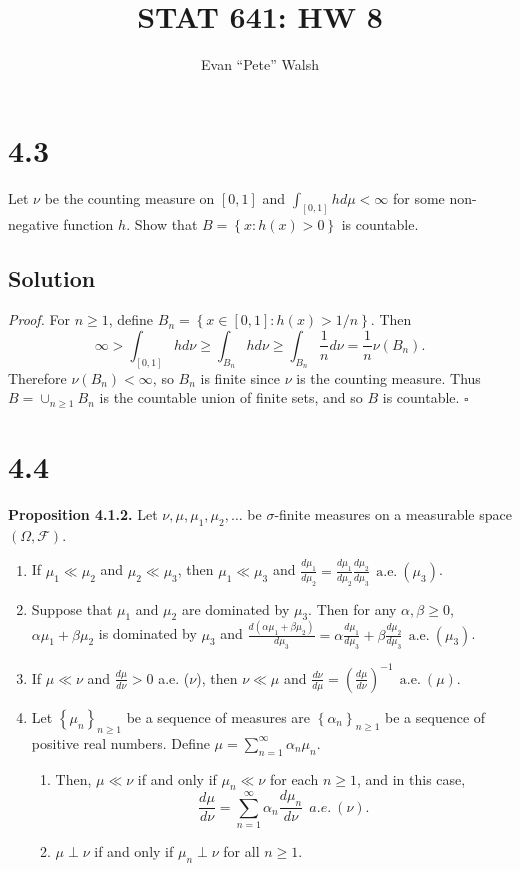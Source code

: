 \documentclass[12pt]{article}
\title{STAT 641: HW 8}
\author{Evan ``Pete'' Walsh}
\newcounter{ProofCounter}
\newenvironment{Proof}{\stepcounter{ProofCounter}\textit{Proof.}}{\hfill$\square$}
\begin{document}
\maketitle

\section*{4.3}
Let $\nu$ be the counting measure on $[0,1]$ and $\int_{[0,1]}hd\mu < \infty$ for some non-negative function $h$. Show that $B = \left\{ x : h(x) > 0
\right\}$ is countable.

\subsection*{Solution}
\begin{Proof}
For $n \geq 1$, define $B_{n} = \left\{ x \in [0,1] : h(x) > 1/n \right\}$. Then 
\[ \infty > \int_{[0,1]}hd\nu \geq \int_{B_{n}}hd\nu \geq \int_{B_{n}}\frac{1}{n}d\nu = \frac{1}{n}\nu(B_{n}). \]
Therefore $\nu(B_{n}) < \infty$, so $B_{n}$ is finite since $\nu$ is the counting measure. Thus $B = \cup_{n\geq 1}B_{n}$ is the countable union of
finite sets, and so $B$ is countable.
\end{Proof}


\newpage 
\section*{4.4}
{\bf Proposition 4.1.2.} Let $\nu, \mu, \mu_{1}, \mu_{2}, \hdots$ be $\sigma$-finite measures on a measurable space $(\Omega, \mathcal{F})$.
\begin{enumerate}[label=(\roman*)]
\item If $\mu_{1} \ll \mu_{2}$ and $\mu_{2} \ll \mu_{3}$, then $\mu_{1} \ll \mu_{3}$ and $\frac{d\mu_{1}}{d\mu_{2}} =
\frac{d\mu_{1}}{d\mu_{2}}\frac{d\mu_{2}}{d\mu_{3}} \ \ \text{a.e.}\  (\mu_{3})$. 
\item Suppose that $\mu_{1}$ and $\mu_{2}$ are dominated by $\mu_{3}$. Then for any $\alpha, \beta \geq 0$, $\alpha\mu_{1} + \beta\mu_{2}$ is
dominated by $\mu_{3}$ and $\frac{d(\alpha\mu_{1} + \beta\mu_{2})}{d\mu_{3}} = \alpha\frac{d\mu_{1}}{d\mu_{3}} + \beta\frac{d\mu_{2}}{d\mu_{3}} \ \
\text{a.e.}\ (\mu_{3})$.
\item If $\mu \ll \nu$ and $\frac{d\mu}{d\nu} > 0$ a.e. ($\nu$), then $\nu \ll \mu$ and $\frac{d\nu}{d\mu} = \left( \frac{d\mu}{d\nu} \right)^{-1}\ \
\text{a.e.}\ (\mu)$. 
\item Let $\left\{ \mu_{n} \right\}_{n\geq 1}$ be a sequence of measures are $\left\{ \alpha_{n} \right\}_{n\geq 1}$ be a sequence of positive real
numbers. Define $\mu = \sum_{n=1}^{\infty}\alpha_{n}\mu_{n}$.
\begin{enumerate}[label=(\alph*)]
\item Then, $\mu \ll \nu$ if and only if $\mu_{n} \ll \nu$ for each $n\geq 1$, and in this case,
\[ \frac{d\mu}{d\nu} = \sum_{n=1}^{\infty}\alpha_{n}\frac{d\mu_{n}}{d\nu}\ \ a.e. \ (\nu). \]
\item $\mu \perp \nu$ if and only if $\mu_{n} \perp \nu$ for all $n\geq 1$.
\end{enumerate}
\end{enumerate}
\end{document}
